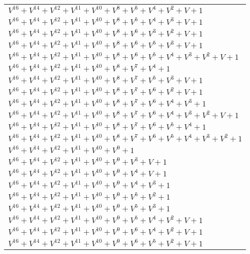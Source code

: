 \documentclass[12pt]{article}
\begin{document}
\begin{adjustwidth}{-4cm}{}
\begin{center}
\begin{longtable}{|l|}
$V^{16}  +V^{14}  +V^{12}  +V^{11}  +V^{10}  +V^{8}  +V^{5}  +V^{4}  +V^{2}  + V + 1$ \\
$V^{16}  +V^{14}  +V^{12}  +V^{11}  +V^{10}  +V^{8}  +V^{5}  +V^{4}  +V^{3}  + V + 1$ \\
$V^{16}  +V^{14}  +V^{12}  +V^{11}  +V^{10}  +V^{8}  +V^{6}  +V^{3}  +V^{2}  + V + 1$ \\
$V^{16}  +V^{14}  +V^{12}  +V^{11}  +V^{10}  +V^{8}  +V^{6}  +V^{5}  +V^{3}  + V + 1$ \\
$V^{16}  +V^{14}  +V^{12}  +V^{11}  +V^{10}  +V^{8}  +V^{6}  +V^{5}  +V^{4}  +V^{3}  +V^{2}  + V + 1$ \\
$V^{16}  +V^{14}  +V^{12}  +V^{11}  +V^{10}  +V^{8}  +V^{7}  +V^{4}  + 1$ \\
$V^{16}  +V^{14}  +V^{12}  +V^{11}  +V^{10}  +V^{8}  +V^{7}  +V^{5}  +V^{3}  + V + 1$ \\
$V^{16}  +V^{14}  +V^{12}  +V^{11}  +V^{10}  +V^{8}  +V^{7}  +V^{6}  +V^{2}  + V + 1$ \\
$V^{16}  +V^{14}  +V^{12}  +V^{11}  +V^{10}  +V^{8}  +V^{7}  +V^{6}  +V^{4}  +V^{3}  + 1$ \\
$V^{16}  +V^{14}  +V^{12}  +V^{11}  +V^{10}  +V^{8}  +V^{7}  +V^{6}  +V^{4}  +V^{3}  +V^{2}  + V + 1$ \\
$V^{16}  +V^{14}  +V^{12}  +V^{11}  +V^{10}  +V^{8}  +V^{7}  +V^{6}  +V^{5}  +V^{4}  + 1$ \\
$V^{16}  +V^{14}  +V^{12}  +V^{11}  +V^{10}  +V^{8}  +V^{7}  +V^{6}  +V^{5}  +V^{4}  +V^{3}  +V^{2}  + 1$ \\
$V^{16}  +V^{14}  +V^{12}  +V^{11}  +V^{10}  +V^{9}  + 1$ \\
$V^{16}  +V^{14}  +V^{12}  +V^{11}  +V^{10}  +V^{9}  +V^{3}  + V + 1$ \\
$V^{16}  +V^{14}  +V^{12}  +V^{11}  +V^{10}  +V^{9}  +V^{4}  + V + 1$ \\
$V^{16}  +V^{14}  +V^{12}  +V^{11}  +V^{10}  +V^{9}  +V^{4}  +V^{3}  + 1$ \\
$V^{16}  +V^{14}  +V^{12}  +V^{11}  +V^{10}  +V^{9}  +V^{5}  +V^{2}  + 1$ \\
$V^{16}  +V^{14}  +V^{12}  +V^{11}  +V^{10}  +V^{9}  +V^{5}  +V^{3}  + 1$ \\
$V^{16}  +V^{14}  +V^{12}  +V^{11}  +V^{10}  +V^{9}  +V^{5}  +V^{4}  +V^{2}  + V + 1$ \\
$V^{16}  +V^{14}  +V^{12}  +V^{11}  +V^{10}  +V^{9}  +V^{6}  +V^{4}  +V^{2}  + V + 1$ \\
$V^{16}  +V^{14}  +V^{12}  +V^{11}  +V^{10}  +V^{9}  +V^{6}  +V^{5}  +V^{2}  + V + 1$ \\

\end{longtable}
\end{center}
\end{adjustwidth}
\end{document}
